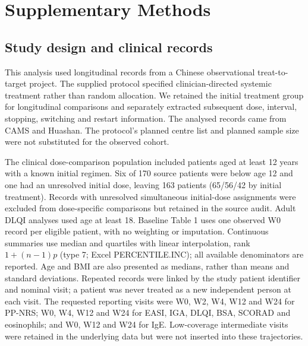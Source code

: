 \documentclass[10pt,a4paper]{article}
\begin{document}
\section{Supplementary Methods}
\subsection{Study design and clinical records}
This analysis used longitudinal records from a Chinese observational treat-to-target project. The supplied protocol specified clinician-directed systemic treatment rather than random allocation. We retained the initial treatment group for longitudinal comparisons and separately extracted subsequent dose, interval, stopping, switching and restart information. The analysed records came from CAMS and Huashan. The protocol's planned centre list and planned sample size were not substituted for the observed cohort.

The clinical dose-comparison population included patients aged at least 12 years with a known initial regimen. Six of 170 source patients were below age 12 and one had an unresolved initial dose, leaving 163 patients (65/56/42 by initial treatment). Records with unresolved simultaneous initial-dose assignments were excluded from dose-specific comparisons but retained in the source audit. Adult DLQI analyses used age at least 18. Baseline Table 1 uses one observed W0 record per eligible patient, with no weighting or imputation. Continuous summaries use median and quartiles with linear interpolation, rank $1+(n-1)p$ (type 7; Excel PERCENTILE.INC); all available denominators are reported. Age and BMI are also presented as medians, rather than means and standard deviations. Repeated records were linked by the study patient identifier and nominal visit; a patient was never treated as a new independent person at each visit. The requested reporting visits were W0, W2, W4, W12 and W24 for PP-NRS; W0, W4, W12 and W24 for EASI, IGA, DLQI, BSA, SCORAD and eosinophils; and W0, W12 and W24 for IgE. Low-coverage intermediate visits were retained in the underlying data but were not inserted into these trajectories.
\end{document}
